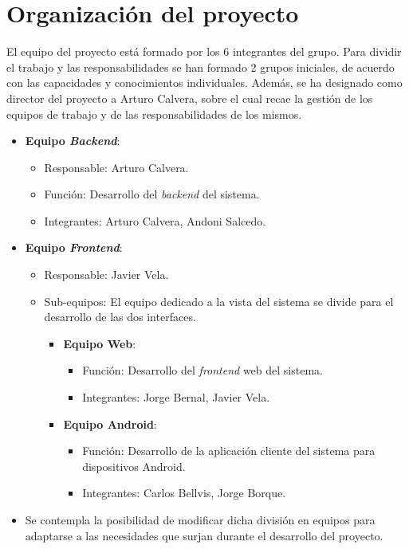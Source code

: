 \documentclass{article}
\begin{document}
\section{Organización del proyecto}

El equipo del proyecto está formado por los 6 integrantes del grupo.  Para dividir el trabajo y las responsabilidades se han formado 2 grupos iniciales,  de acuerdo con las capacidades y conocimientos individuales.  Además, se ha designado como director del proyecto a Arturo Calvera, sobre el cual recae la gestión de los equipos de trabajo y de las responsabilidades de los mismos.

\begin{itemize}
    \setlength{\itemsep}{0em}
    \item \textbf{Equipo \textit{Backend}}:
    \begin{itemize}
        \setlength{\itemsep}{0em}
        \item Responsable: Arturo Calvera.
        \item Función: Desarrollo del \textit{backend} del sistema.
        \item Integrantes: Arturo Calvera, Andoni Salcedo.
    \end{itemize}
    \item \textbf{Equipo \textit{Frontend}}:
    \begin{itemize}
        \setlength{\itemsep}{0em}
        \item Responsable: Javier Vela.
        \item Sub-equipos: El equipo dedicado a la vista del sistema se divide para el desarrollo de las dos interfaces.
        \begin{itemize}
            \setlength{\itemsep}{0em}
            \item \textbf{Equipo Web}:
            \begin{itemize}
                \setlength{\itemsep}{0em}
                \item Función: Desarrollo del \textit{frontend} web del sistema.
                \item Integrantes: Jorge Bernal, Javier Vela.
            \end{itemize}
        \item \textbf{Equipo Android}:
            \begin{itemize}
                \setlength{\itemsep}{0em}
                \item Función: Desarrollo de la aplicación cliente del sistema para dispositivos Android.
                \item Integrantes: Carlos Bellvis, Jorge Borque.
            \end{itemize}
        \end{itemize}
    \end{itemize}
    \item Se contempla la posibilidad de modificar dicha división en equipos para adaptarse a las necesidades que surjan durante el desarrollo del proyecto.
\end{itemize}
\end{document}
